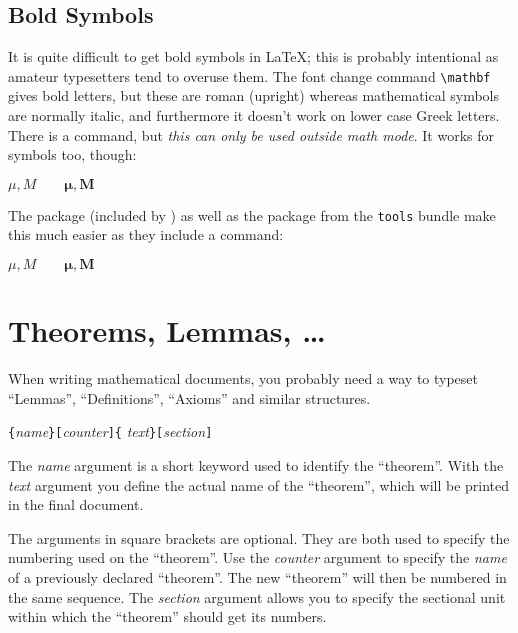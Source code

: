 

\subsection{Bold Symbols}

It is quite difficult to get bold symbols in \LaTeX{}; this is
probably intentional as amateur typesetters tend to overuse them.  The
font change command \verb|\mathbf| gives bold letters, but these are
roman (upright) whereas mathematical symbols are normally italic, and
furthermore it doesn't work on lower case Greek letters.
There is a  command, but \emph{this can only be used
outside math mode}. It works for symbols too, though:
\begin{example}
$\mu, M \qquad 
\mathbf{\mu}, \mathbf{M}$
\qquad {}
\end{example}

The package  (included by ) as well as the
package  from the \texttt{tools} bundle make this much easier as they include
a  command:

\begin{example}
$\mu, M \qquad
\boldsymbol{\mu}, \boldsymbol{M}$
\end{example}


\section{Theorems, Lemmas, \ldots}

When writing mathematical documents, you probably need a way to
typeset ``Lemmas'', ``Definitions'', ``Axioms'' and similar
structures.
\begin{lscommand}
\verb|{|\emph{name}\verb|}[|\emph{counter}\verb|]{|%
         \emph{text}\verb|}[|\emph{section}\verb|]|
\end{lscommand}
The \emph{name} argument is a short keyword used to identify the
``theorem''. With the \emph{text} argument you define the actual name
of the ``theorem'', which will be printed in the final document.

The arguments in square brackets are optional. They are both used to
specify the numbering used on the ``theorem''. Use  the \emph{counter}
argument to specify the \emph{name} of a previously declared
``theorem''. The new ``theorem'' will then be numbered in the same
sequence.  The \emph{section} argument allows you to specify the
sectional unit within which the ``theorem'' should get its numbers.


